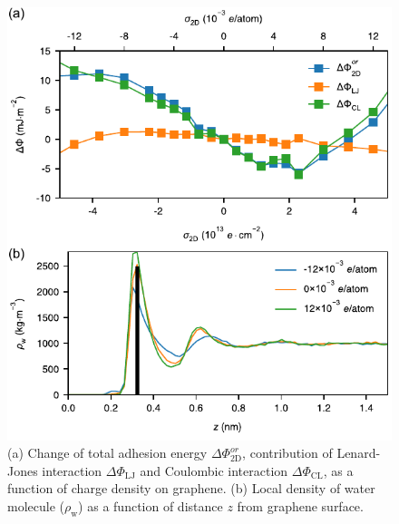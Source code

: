 \documentclass[journal=ancac3,manuscript=article,email=true]{achemso}
\begin{document}
\begin{figure}[htbp]
\centering
\includegraphics[width=0.9\linewidth]{../img/fig-pot-dens.pdf}
\caption{\label{fig:pot-dens}
(a) Change of total adhesion energy \(\Delta\Phi_{\mathrm{2D}}^{or}\), contribution of Lenard-Jones interaction \(\Delta\Phi_{\mathrm{LJ}}\) and Coulombic interaction \(\Delta\Phi_{\mathrm{CL}}\), as a function of charge density on graphene. (b) Local density of water molecule (\(\rho_{\mathrm{w}}\))  as a function of distance \(z\) from graphene surface.}
\end{figure}
\end{document}
